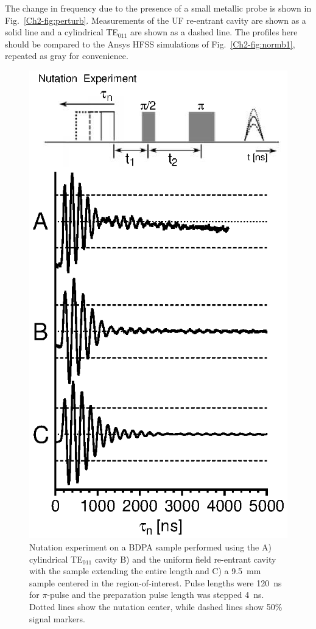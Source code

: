 The change in frequency due to the presence of a small metallic probe is shown in Fig.~\ref{Ch2-fig:perturb}. Measurements of the UF re-entrant \cylTE{} cavity are shown as a solid line and a cylindrical TE$_{011}$ are shown as a dashed line. The profiles here should be compared to the Ansys HFSS simulations of Fig.~\ref{Ch2-fig:normb1}, repeated as gray for convenience. 

\begin{figure}[htp]\centering
 \includegraphics{Kapitel/Ch2-Images/06-Nutation.eps}
 \caption[Nutation experiment comparison.]{Nutation experiment on a BDPA sample performed using the A) cylindrical TE$_{011}$ cavity B) and the uniform field re-entrant \cylTE{} cavity with the sample extending the entire length and C) a 9.5~mm sample centered in the region-of-interest. Pulse lengths were 120~ns for $\pi$-pulse and the preparation pulse length was stepped 4~ns. Dotted lines show the nutation center, while dashed lines show 50\% signal markers.}
 \label{Ch2-fig:nutation}
\end{figure}

